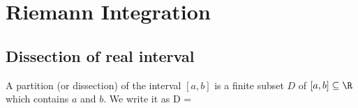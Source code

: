 








\section{Riemann Integration}



\subsection{Dissection of real interval}

\begin{definition}\label{def:partition_real_interval}
A partition (or dissection) of the interval $[a,b]$ is a finite subset $D$ of $[a,b]\subseteq \R$ which contains $a$ and $b$. We write it as
\be
D = 
\ee
\end{definition}


%
%
%
%
%
%
%
%

